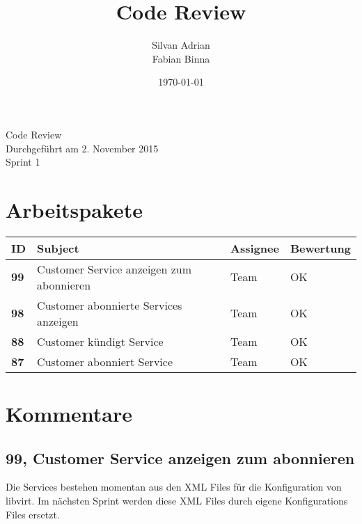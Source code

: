 \documentclass[11pt]{scrartcl}
\title{Code Review}
\author{Silvan Adrian \\ Fabian Binna}
\date{\today{}}
\begin{document}
\def\arraystretch{1.5}
\begin{titlepage}
\begin{center}
\vspace{10em}

\vspace{10em}
\end{center}
\begin{center}
\huge {Code Review}\\

Durchgeführt am 2. November 2015\\
Sprint 1
\end{center}

\end{titlepage}

\newpage
\tableofcontents
\newpage

\section{Arbeitspakete}

\begin{center}

\begin{tabularx}{\linewidth}{l l l l}
\textbf{ID} & \textbf{Subject} & \textbf{Assignee} & \textbf{Bewertung}\\
\hline
\textbf{99} & Customer Service anzeigen zum abonnieren & Team & OK \\
\textbf{98} & Customer abonnierte Services anzeigen & Team & OK\\
\textbf{88} & Customer kündigt Service & Team & OK\\
\textbf{87} & Customer abonniert Service & Team & OK\\
\end{tabularx}

\end{center}
\newpage

\section{Kommentare}

\subsection{99, Customer Service anzeigen zum abonnieren}
Die Services bestehen momentan aus den XML Files für die Konfiguration von libvirt. Im nächsten Sprint werden diese XML Files durch eigene Konfigurations Files ersetzt.\\
\end{document}
